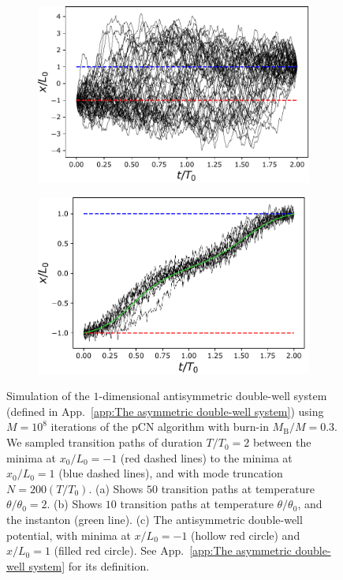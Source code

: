 \begin{figure}
    \begin{subfigure}[b]{0.47\textwidth}  
        \centering 
        \includegraphics[width=\textwidth]{figs_part1/mcmc/1D_process_trajectories}
        \caption[]%
        {}    
        \label{fig:1D process trajectories hot}
    \end{subfigure}
    \hfill
    \begin{subfigure}[b]{0.47\textwidth}
        \centering
        \includegraphics[width=\textwidth]{figs_part1/mcmc/1D_process_cold_trajectories}
        \caption[]%
        {}    
        \label{fig:1D process trajectories cold}
    \end{subfigure}     

    
    \caption[ ]
    {\small Simulation of the $1$-dimensional antisymmetric double-well system (defined in App.~\ref{app:The asymmetric double-well system}) using $M=10^8$ iterations of the pCN algorithm with burn-in $M_\text{B}/M = 0.3$. We sampled transition paths of duration $T/T_0 = 2$ between the minima at $x_0/L_0 = -1$ (red dashed lines) to the minima at $x_0/L_0 = 1$ (blue dashed lines), and with mode truncation $N = 200(T/T_0)$. (a) Shows $50$ transition paths at temperature $\theta / \theta_0 = 2$. (b) Shows $10$ transition paths at temperature $\theta / \theta_0$, and the instanton (green line). (c) The antisymmetric double-well potential, with minima at $x/L_0 = -1$ (hollow red circle) and $x/L_0=1$ (filled red circle). See App.~\ref{app:The asymmetric double-well system} for its definition.}
    \label{fig:1D process trajectories}
\end{figure} 

